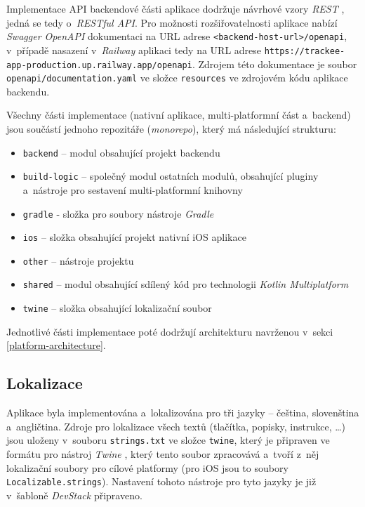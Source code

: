 Implementace API backendové části aplikace dodržuje návrhové vzory \emph{REST} \cite{rest-api}, jedná se tedy o~\emph{RESTful API}. Pro možnosti rozšiřovatelnosti aplikace nabízí \emph{Swagger OpenAPI} dokumentaci \cite{swagger-open-api} na URL adrese \texttt{<backend-host-url>/openapi}, v~případě nasazení v~\emph{Railway} aplikaci tedy na URL adrese \texttt{https://trackee-app-production.up.railway.app/openapi}. Zdrojem této dokumentace je soubor \texttt{openapi/documentation.yaml} ve složce \texttt{resources} ve zdrojovém kódu aplikace backendu.

Všechny části implementace (nativní aplikace, multi-platformní část a~backend) jsou součástí jednoho repozitáře (\emph{monorepo}), který má následující strukturu:
\begin{itemize}
\item\texttt{backend} – modul obsahující projekt backendu
\item\texttt{build-logic} – společný modul ostatních modulů, obsahující pluginy a~nástroje pro sestavení multi-platformní knihovny
\item\texttt{gradle} - složka pro soubory nástroje \emph{Gradle}
\item\texttt{ios} – složka obsahující projekt nativní iOS aplikace
\item\texttt{other} – nástroje projektu
\item\texttt{shared} – modul obsahující sdílený kód pro technologii \emph{Kotlin Multiplatform}
\item\texttt{twine} – složka obsahující lokalizační soubor
\end{itemize}
Jednotlivé části implementace poté dodržují architekturu navrženou v~sekci \ref{platform-architecture}.

\subsection{Lokalizace}

Aplikace byla implementována a~lokalizována pro tři jazyky – čeština, slovenština a~angličtina. Zdroje pro lokalizace všech textů (tlačítka, popisky, instrukce, \dots) jsou uloženy v~souboru \texttt{strings.txt} ve složce \texttt{twine}, který je připraven ve formátu pro nástroj \emph{Twine} \cite{twine}, který tento soubor zpracovává a~tvoří z~něj lokalizační soubory pro cílové platformy (pro iOS jsou to soubory \texttt{Localizable.strings}). Nastavení tohoto nástroje pro tyto jazyky je již v~šabloně \emph{DevStack} připraveno.

